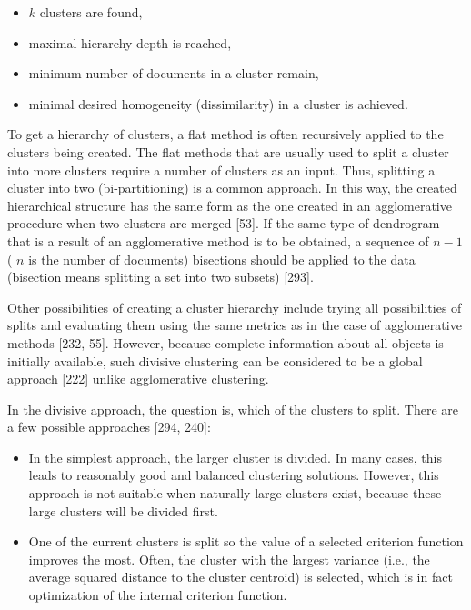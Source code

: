 \documentclass[10pt]{book}
\begin{document}
\begin{itemize}
  \item $k$ clusters are found,
  \item maximal hierarchy depth is reached,
  \item minimum number of documents in a cluster remain,
  \item minimal desired homogeneity (dissimilarity) in a cluster is achieved.
\end{itemize}

To get a hierarchy of clusters, a flat method is often recursively applied to the clusters being created. The flat methods that are usually used to split a cluster into more clusters require a number of clusters as an input. Thus, splitting a cluster into two (bi-partitioning) is a common approach. In this way, the created hierarchical structure has the same form as the one created in an agglomerative procedure when two clusters are merged [53]. If the same type of dendrogram that is a result of an agglomerative method is to be obtained, a sequence of $n-1$ ( $n$ is the number of documents) bisections should be applied to the data (bisection means splitting a set into two subsets) [293].

Other possibilities of creating a cluster hierarchy include trying all possibilities of splits and evaluating them using the same metrics as in the case of agglomerative methods [232, 55]. However, because complete information about all objects is initially available, such divisive clustering can be considered to be a global approach [222] unlike agglomerative clustering.

In the divisive approach, the question is, which of the clusters to split. There are a few possible approaches [294, 240]:

\begin{itemize}
  \item In the simplest approach, the larger cluster is divided. In many cases, this leads to reasonably good and balanced clustering solutions. However, this approach is not suitable when naturally large clusters exist, because these large clusters will be divided first.
  \item One of the current clusters is split so the value of a selected criterion function improves the most. Often, the cluster with the largest variance (i.e., the average squared distance to the cluster centroid) is selected, which is in fact optimization of the internal criterion function.
\end{itemize}
\end{document}
